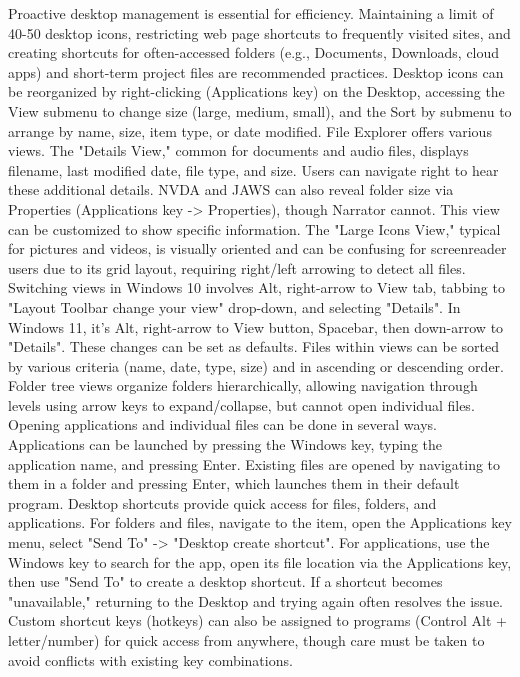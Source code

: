 Proactive desktop management is essential for efficiency. Maintaining a limit of 40-50 desktop icons, restricting web page shortcuts to frequently visited sites, and creating shortcuts for often-accessed folders (e.g., Documents, Downloads, cloud apps) and short-term project files are recommended practices.\supercite{kingsbury2025} Desktop icons can be reorganized by right-clicking (Applications key) on the Desktop, accessing the View submenu to change size (large, medium, small), and the Sort by submenu to arrange by name, size, item type, or date modified.\supercite{kingsbury2025}
File Explorer offers various views. The "Details View," common for documents and audio files, displays filename, last modified date, file type, and size.\supercite{kingsbury2025} Users can navigate right to hear these additional details. NVDA and JAWS can also reveal folder size via Properties (Applications key -\textgreater{} Properties), though Narrator cannot.\supercite{kingsbury2025} This view can be customized to show specific information.\supercite{kingsbury2025} The "Large Icons View," typical for pictures and videos, is visually oriented and can be confusing for screenreader users due to its grid layout, requiring right/left arrowing to detect all files.\supercite{kingsbury2025} Switching views in Windows 10 involves Alt, right-arrow to View tab, tabbing to "Layout Toolbar change your view" drop-down, and selecting "Details".\supercite{kingsbury2025} In Windows 11, it's Alt, right-arrow to View button, Spacebar, then down-arrow to "Details".\supercite{kingsbury2025} These changes can be set as defaults.\supercite{kingsbury2025} Files within views can be sorted by various criteria (name, date, type, size) and in ascending or descending order.\supercite{kingsbury2025} Folder tree views organize folders hierarchically, allowing navigation through levels using arrow keys to expand/collapse, but cannot open individual files.\supercite{kingsbury2025}
Opening applications and individual files can be done in several ways. Applications can be launched by pressing the Windows key, typing the application name, and pressing Enter.\supercite{kingsbury2025} Existing files are opened by navigating to them in a folder and pressing Enter, which launches them in their default program.\supercite{kingsbury2025} Desktop shortcuts provide quick access for files, folders, and applications. For folders and files, navigate to the item, open the Applications key menu, select "Send To" -\textgreater{} "Desktop create shortcut".\supercite{kingsbury2025} For applications, use the Windows key to search for the app, open its file location via the Applications key, then use "Send To" to create a desktop shortcut.\supercite{kingsbury2025} If a shortcut becomes "unavailable," returning to the Desktop and trying again often resolves the issue.\supercite{kingsbury2025} Custom shortcut keys (hotkeys) can also be assigned to programs (Control Alt + letter/number) for quick access from anywhere, though care must be taken to avoid conflicts with existing key combinations.\supercite{kingsbury2025}

